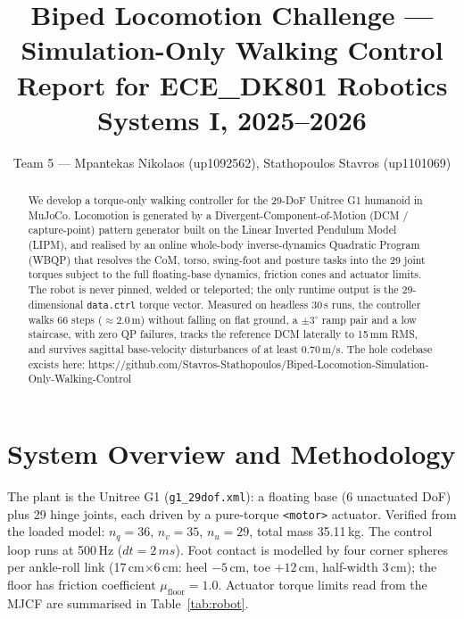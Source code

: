 \documentclass[10pt,a4paper]{article}
\title{\vspace{-1.2cm}\textbf{Biped Locomotion Challenge --- Simulation-Only Walking Control}\\[2pt]
\large Report for ECE\_DK801 Robotics Systems I, 2025--2026}
\author{Team 5 --- Mpantekas Nikolaos (up1092562), Stathopoulos Stavros (up1101069)}
\date{}
\newcommand{\SI}[2]{#1\,#2}          %
\newcommand{\code}[1]{\texttt{\small #1}}
\begin{document}
\maketitle
\vspace{-1.0cm}

\begin{abstract}
\small
We develop a torque-only walking controller for the 29-DoF Unitree G1 humanoid in
MuJoCo. Locomotion is generated by a Divergent-Component-of-Motion (DCM /
capture-point) pattern generator built on the Linear Inverted Pendulum Model
(LIPM), and realised by an online whole-body inverse-dynamics Quadratic Program
(WBQP) that resolves the CoM, torso, swing-foot and posture tasks into the 29
joint torques subject to the full floating-base dynamics, friction cones and
actuator limits. The robot is never pinned, welded or teleported; the only
runtime output is the 29-dimensional \code{data.ctrl} torque vector. Measured on
headless 30\,s runs, the controller walks 66 steps ($\approx$2.0\,m) without
falling on flat ground, a $\pm3^\circ$ ramp pair and a low staircase, with zero
QP failures, tracks the reference DCM laterally to 15\,mm RMS, and survives
sagittal base-velocity disturbances of at least 0.70\,m/s.
The hole codebase excists here: https://github.com/Stavros-Stathopoulos/Biped-Locomotion-Simulation-Only-Walking-Control
\end{abstract}

\section{System Overview and Methodology}
The plant is the Unitree G1 (\code{g1\_29dof.xml}): a floating base (6 unactuated
DoF) plus 29 hinge joints, each driven by a pure-torque \code{<motor>}
actuator. Verified from the loaded model: $n_q=36$, $n_v=35$, $n_u=29$, total
mass \SI{35.11}{kg}. The control loop runs at \SI{500}{Hz} ($dt=\SI{2}{ms}$).
Foot contact is modelled by four corner spheres per ankle-roll link
(\SI{17}{cm}$\times$\SI{6}{cm}: heel $-5$\,cm, toe $+12$\,cm, half-width
\SI{3}{cm}); the floor has friction coefficient $\mu_{\text{floor}}=1.0$. Actuator
torque limits read from the MJCF are summarised in Table~\ref{tab:robot}.
\end{document}
